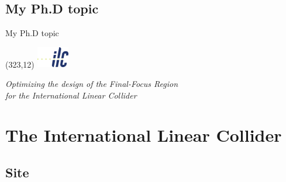 \documentclass[xcolor={dvipsnames}]{beamer}
\newcommand{\ilclogo}{
  \setlength{\TPHorizModule}{1pt}
  \setlength{\TPVertModule}{1pt}
  \begin{textblock}{1}(323,12)
   \includegraphics[width=40pt,height=26pt]{figures/ILC.jpeg}
  \end{textblock}
}
\begin{document}
\subsection{My Ph.D topic}
\begin{frame}{My Ph.D topic}
\ilclogo
\begin{center}
\begin{block}{}
\centering
\textit{Optimizing the design of the Final-Focus Region\\for the International Linear Collider}
\end{block}
\end{center}
\end{frame}

\section{The International Linear Collider}
\subsection{Site}
\end{document}
